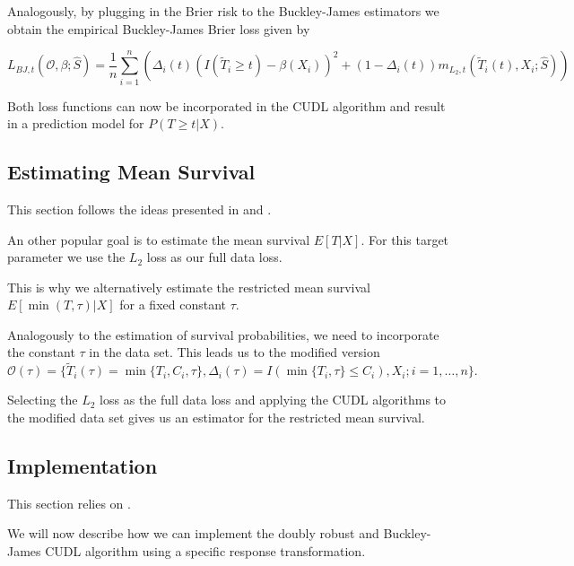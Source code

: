 \documentclass[12pt, a4paper]{article}
\theoremstyle{definition}
\theoremstyle{plain}
\numberwithin{equation}{section}
\numberwithin{figure}{section}
\numberwithin{table}{section}
\begin{document}
	Analogously, by plugging in the Brier risk to the Buckley-James estimators we obtain the empirical Buckley-James Brier loss given by
	
	\begin{equation*}
		L_{BJ,t}(\mathcal{O},\beta; \hat{S}) = \frac{1}{n} \sum_{i=1}^n \left( \Delta_i(t)(I(\tilde{T}_i\geq t)-\beta(X_i))^2 + (1- \Delta_i(t))m_{L_2,t}(\tilde{T}_i(t), X_i; \hat{S})\right)
	\end{equation*}
	
	Both loss functions can now be incorporated in the CUDL algorithm and result in a prediction model for $P(T\geq t\vert X)$.

	\subsection{Estimating Mean Survival}
	
	This section follows the ideas presented in \citet*{basearticle} and \citet*{strawderman}.
	
	An other popular goal is to estimate the mean survival $E[T\vert X]$.
	For this target parameter we use the $L_2$ loss as our full data loss.
	
	
	This is why we alternatively estimate the restricted mean survival $E[\min(T, \tau)\vert X]$ for a fixed constant $\tau$.
	
	Analogously to the estimation of survival probabilities, we need to incorporate the constant $\tau$ in the data set.
	This leads us to the modified version	
	\begin{equation*}
		\mathcal{O}(\tau) = \{\tilde{T}_i(\tau) = \min\{T_i, C_i, \tau\}, \Delta_i(\tau) = I(\min\{T_i, \tau\}\leq C_i), X_i; i = 1, \dots , n\}.
	\end{equation*}
	
	Selecting the $L_2$ loss as the full data loss and applying the CUDL algorithms to the modified data set gives us an estimator for the restricted mean survival.
	
	\subsection{Implementation}
	
	This section relies on \citet*{basearticle}.
	
	We will now describe how we can implement the doubly robust and Buckley-James CUDL algorithm using a specific response transformation.
	
\end{document}
